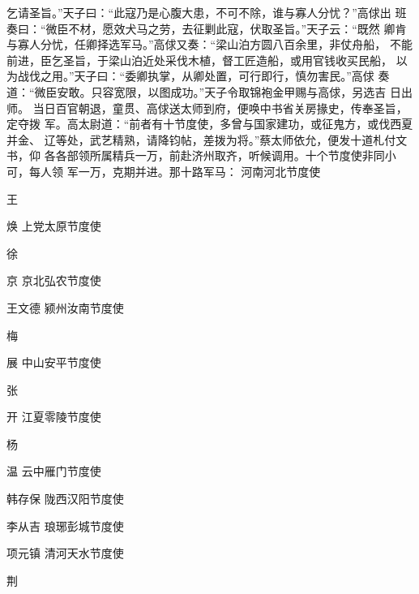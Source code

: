 乞请圣旨。”天子曰：“此寇乃是心腹大患，不可不除，谁与寡人分忧？”高俅出
班奏曰：“微臣不材，愿效犬马之劳，去征剿此寇，伏取圣旨。”天子云：“既然
卿肯与寡人分忧，任卿择选军马。”高俅又奏：“梁山泊方圆八百余里，非仗舟船，
不能前进，臣乞圣旨，于梁山泊近处采伐木植，督工匠造船，或用官钱收买民船，
以为战伐之用。”天子曰：“委卿执掌，从卿处置，可行即行，慎勿害民。”高俅
奏道：“微臣安敢。只容宽限，以图成功。”天子令取锦袍金甲赐与高俅，另选吉
日出师。
当日百官朝退，童贯、高俅送太师到府，便唤中书省关房掾史，传奉圣旨，定夺拨
军。高太尉道：“前者有十节度使，多曾与国家建功，或征鬼方，或伐西夏并金、
辽等处，武艺精熟，请降钧帖，差拨为将。”蔡太师依允，便发十道札付文书，仰
各各部领所属精兵一万，前赴济州取齐，听候调用。十个节度使非同小可，每人领
军一万，克期并进。那十路军马：
河南河北节度使

王

焕
上党太原节度使

徐

京
京北弘农节度使

王文德
颍州汝南节度使

梅

展
中山安平节度使

张

开
江夏零陵节度使

杨

温
云中雁门节度使

韩存保
陇西汉阳节度使

李从吉
琅琊彭城节度使

项元镇
清河天水节度使

荆

